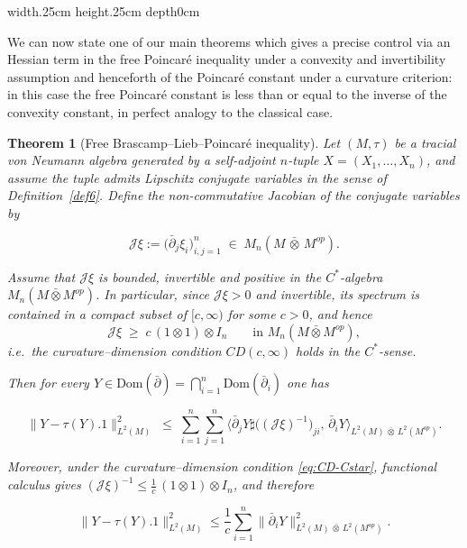 \documentclass[10pt,a4paper,reqno]{amsart}
\newtheorem{theorem}{Theorem}[section]
\def\qed{ \hfill \vrule width.25cm height.25cm depth0cm\smallskip}
\newcommand{\Dom}{\mathrm{Dom}}
\begin{document}
\qed
\begin{flushleft}
We can now state one of our main theorems which gives a precise control via an Hessian term in the free Poincar\'e inequality under a convexity and invertibility assumption and henceforth of the Poincar\'e constant under a curvature criterion: in this case the free Poincar\'e constant is less than or equal to the inverse of the convexity constant, in perfect analogy to the classical case.
\end{flushleft}
\begin{theorem}[Free Brascamp--Lieb--Poincar\'e inequality]\label{thm:BLP-Lipschitz}
Let $(M,\tau)$ be a tracial von Neumann algebra generated by a self-adjoint $n$-tuple
$X=(X_1,\ldots,X_n)$, and assume the tuple admits Lipschitz conjugate variables in the
sense of Definition~\ref{def6}.  Define the non-commutative Jacobian of the conjugate
variables by


\[
\mathscr J\xi := \big(\bar\partial_j \xi_i\big)_{i,j=1}^n \;\in\; M_n(M\,\bar\otimes\,M^{op}).
\]



Assume that $\mathscr J\xi$ is bounded, invertible and positive in the $C^*$-algebra
$M_n(M\bar\otimes M^{op})$.  In particular, since $\mathscr J\xi>0$ and invertible,
its spectrum is contained in a compact subset of $[c,\infty)$ for some $c>0$, and hence
\begin{equation}\label{eq:CD-Cstar}
\mathscr J\xi \;\ge\; c\,(1\otimes 1)\otimes I_n
\qquad\text{in } M_n(M\bar\otimes M^{op}),
\end{equation}
i.e.\ the curvature--dimension condition $CD(c,\infty)$ holds in the $C^*$-sense.

Then for every $Y\in \Dom(\bar\partial)=\bigcap_{i=1}^n \Dom(\bar\partial_i)$ one has


\[
\big\|Y-\tau(Y).1\big\|_{L^2(M)}^2
\;\le\;
\sum_{i=1}^n\sum_{j=1}^n
\Big\langle\bar\partial_j Y\sharp\big((\mathscr J\xi)^{-1}\big)_{ji},\,
\bar\partial_i Y\Big\rangle_{L^2(M)\,\bar\otimes\,L^2(M^{op})}.
\]



Moreover, under the curvature--dimension condition \eqref{eq:CD-Cstar}, functional
calculus gives $(\mathscr J\xi)^{-1}\le \frac{1}{c}\,(1\otimes 1)\otimes I_n$, and
therefore


\[
\big\|Y-\tau(Y). 1\big\|_{L^2(M)}^2
\le
\frac{1}{c}\sum_{i=1}^n
\big\|\bar\partial_i Y\big\|_{L^2(M)\,\bar\otimes\,L^2(M^{op})}^2.
\]


\end{theorem}
\end{document}

